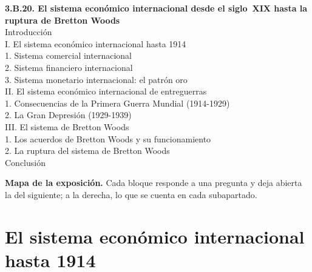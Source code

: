\documentclass[11pt]{article}
\begin{document}
\begin{esquema}[unbreakable]
\textbf{3.B.20. El sistema económico internacional desde el siglo~XIX hasta la ruptura de Bretton Woods}\\[2pt]
Introducción\\
I. El sistema económico internacional hasta 1914\\
\hspace*{1.5em}1. Sistema comercial internacional\\
\hspace*{1.5em}2. Sistema financiero internacional\\
\hspace*{1.5em}3. Sistema monetario internacional: el patrón oro\\
II. El sistema económico internacional de entreguerras\\
\hspace*{1.5em}1. Consecuencias de la Primera Guerra Mundial (1914-1929)\\
\hspace*{1.5em}2. La Gran Depresión (1929-1939)\\
III. El sistema de Bretton Woods\\
\hspace*{1.5em}1. Los acuerdos de Bretton Woods y su funcionamiento\\
\hspace*{1.5em}2. La ruptura del sistema de Bretton Woods\\
Conclusión
\end{esquema}

\begin{anotaciones}
\textbf{Mapa de la exposición.} Cada bloque responde a una pregunta y deja abierta la del siguiente; a la derecha, lo que se cuenta en cada subapartado.
\begin{infografiacaja}
\caption{Mapa del tema: la pregunta de cada bloque, sus subapartados y el hilo que los une}\label{figu:mapa-tema}
\end{infografiacaja}
\end{anotaciones}




\section{El sistema económico internacional hasta 1914}\label{sec:hasta1914}
\end{document}
